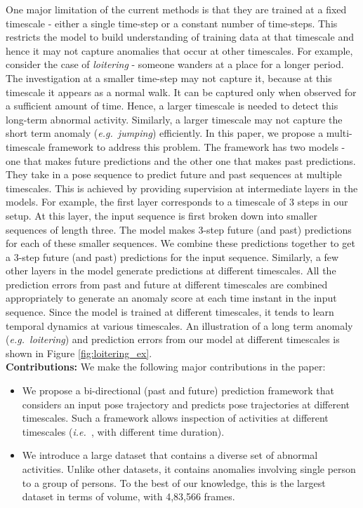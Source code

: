\documentclass[conference]{IEEEtran}
\def\ie{\emph{i.e.~}}
\def\eg{\emph{e.g.~}}
\begin{document}
One major limitation of the current methods is that they are trained at a fixed timescale - either a single time-step or a constant number of time-steps. This restricts the model to build understanding of training data at that timescale and hence it may not capture anomalies that occur at other timescales. For example, consider the case of \textit{loitering} - someone wanders at a place for a longer period. The investigation at a smaller time-step may not capture it, because at this timescale it appears as a normal walk. It can be captured only when observed for a sufficient amount of time. Hence, a larger timescale is needed to detect this long-term abnormal activity. Similarly, a larger timescale may not capture the short term anomaly (\eg \textit{jumping}) efficiently. In this paper, we propose a multi-timescale framework to address this problem. The framework has two models - one that makes future predictions and the other one that makes past predictions. They take in a pose sequence to predict future and past sequences at multiple timescales. This is achieved by providing supervision at intermediate layers in the models. For example, the first layer corresponds to a timescale of 3 steps in our setup. At this layer, the input sequence is first broken down into smaller sequences of length three. The model makes 3-step future (and past) predictions for each of these smaller sequences. We combine these predictions together to get a 3-step future (and past) predictions for the input sequence. Similarly, a few other layers in the model generate predictions at different timescales. All the prediction errors from past and future at different timescales are combined appropriately to generate an anomaly score at each time instant in the input sequence. Since the model is trained at different timescales, it tends to learn temporal dynamics at various timescales. An illustration of a long term anomaly (\eg \textit{loitering}) and prediction errors from our model at different timescales is shown in Figure \ref{fig:loitering_ex}. \\

\textbf{Contributions:} We make the following major contributions in the paper:
\begin{itemize}
    \item We propose a bi-directional (past and future) prediction framework that considers an input pose trajectory and predicts pose trajectories at different timescales. Such a framework allows inspection of activities at different timescales (\ie, with different time duration).
    \item We introduce a large dataset that contains a diverse set of abnormal activities. Unlike other datasets, it contains anomalies involving single person to a group of persons. To the best of our knowledge, this is the largest dataset in terms of volume, with 4,83,566 frames.
\end{itemize}
\end{document}
